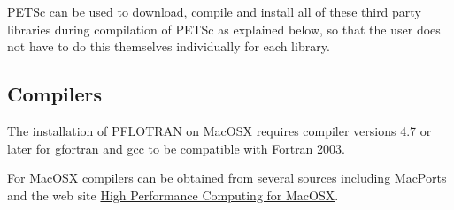 PETSc can be used to download, compile and install all of these third party libraries during compilation of PETSc as explained below, so that the user does not have to do this themselves individually for each library.

\subsection{Compilers}

The installation of PFLOTRAN on MacOSX requires compiler versions 4.7 or later for gfortran and gcc to be compatible with Fortran 2003. 

For MacOSX compilers can be obtained from several sources including \href{http://www.macports.org/}{MacPorts} and the web site \href{http://hpc.sourceforge.net/}{High Performance Computing for MacOSX}.

\begin{comment}
\subsection{MacOSX}

The installation of PFLOTRAN on MacOSX requires compiler versions 4.7.2 or later for gfortran and gcc and must be compatible with object oriented features in Fortran 2003. 

\subsubsection{OpenMPI}

\begin{verbatim}
setenv F90 gfortran
setenv F77 gfortran
setenv FC gfortran
setenv CC gcc-4
setenv CXX g++-4

./configure \
--prefix=$PKGS/openmpi/openmpi-1.4.1-gcc-4.4.2-gfortran \
--disable-debug \
--enable-static \
--disable-shared

make
make install
\end{verbatim}

\subsubsection{Hypre}

\begin{verbatim}
./configure \
--with-MPI \
--enable-debug \
--disable-opt \
--prefix=${HYPRE_INSTALL_DIR} \
--with-MPI-include=${MPI_HOME}/include \
--with-MPI-libs=openmpi \
--with-MPI-lib-dirs=${MPI_HOME}/lib \
CC=mpicc \
CXX=mpicxx \
F77=mpif90

make
make install
\end{verbatim}
\end{comment}

